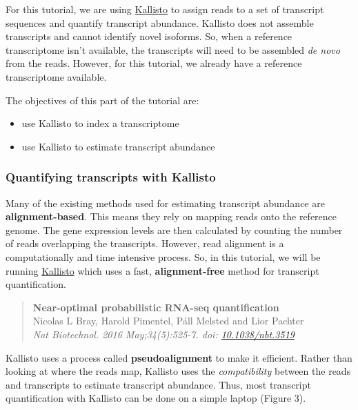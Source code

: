\documentclass[11pt]{article}
\providecommand{\tightlist}{%
      \setlength{\itemsep}{0pt}\setlength{\parskip}{0pt}}
\begin{document}
For this tutorial, we are using
\href{https://pachterlab.github.io/kallisto/}{Kallisto} to assign reads
to a set of transcript sequences and quantify transcript abundance.
Kallisto does not assemble transcripts and cannot identify novel
isoforms. So, when a reference transcriptome isn't available, the
transcripts will need to be assembled \textit{de novo} from the reads.
However, for this tutorial, we already have a reference transcriptome
available.

The objectives of this part of the tutorial are:

\begin{itemize}
\tightlist
\item
  use Kallisto to index a transcriptome
\item
  use Kallisto to estimate transcript abundance
\end{itemize}

    \hypertarget{quantifying-transcripts-with-kallisto}{%
\subsubsection{Quantifying transcripts with
Kallisto}\label{quantifying-transcripts-with-kallisto}}

Many of the existing methods used for estimating transcript abundance
are \textbf{alignment-based}. This means they rely on mapping reads onto
the reference genome. The gene expression levels are then calculated by
counting the number of reads overlapping the transcripts. However, read
alignment is a computationally and time intensive process. So, in this
tutorial, we will be running
\href{https://pachterlab.github.io/kallisto/}{Kallisto} which uses a
fast, \textbf{alignment-free} method for transcript quantification.

\begin{quote}
\textbf{Near-optimal probabilistic RNA-seq quantification}\\
Nicolas L Bray, Harold Pimentel, Páll Melsted and Lior Pachter\\
\textit{Nat Biotechnol. 2016 May;34(5):525-7. doi:
\href{https://www.nature.com/articles/nbt.3519}{10.1038/nbt.3519}}
\end{quote}

Kallisto uses a process called \textbf{pseudoalignment} to make it
efficient. Rather than looking at where the reads map, Kallisto uses the
\textit{compatibility} between the reads and transcripts to estimate
transcript abundance. Thus, most transcript quantification with Kallisto
can be done on a simple laptop (Figure 3).
\end{document}
